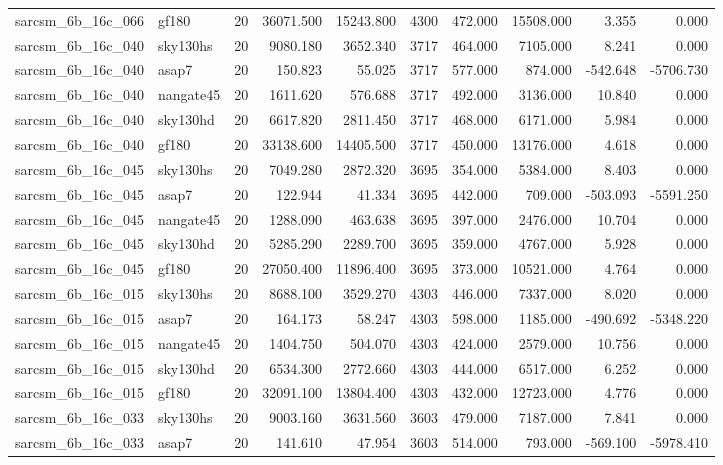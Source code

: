 \documentclass{article}
\begin{document}
\begin{longtable}{llrrrrrrrr}
sarcsm\_6b\_16c\_066 & gf180 & 20 & 36071.500 & 15243.800 & 4300 & 472.000 & 15508.000 & 3.355 & 0.000 \\
sarcsm\_6b\_16c\_040 & sky130hs & 20 & 9080.180 & 3652.340 & 3717 & 464.000 & 7105.000 & 8.241 & 0.000 \\
sarcsm\_6b\_16c\_040 & asap7 & 20 & 150.823 & 55.025 & 3717 & 577.000 & 874.000 & -542.648 & -5706.730 \\
sarcsm\_6b\_16c\_040 & nangate45 & 20 & 1611.620 & 576.688 & 3717 & 492.000 & 3136.000 & 10.840 & 0.000 \\
sarcsm\_6b\_16c\_040 & sky130hd & 20 & 6617.820 & 2811.450 & 3717 & 468.000 & 6171.000 & 5.984 & 0.000 \\
sarcsm\_6b\_16c\_040 & gf180 & 20 & 33138.600 & 14405.500 & 3717 & 450.000 & 13176.000 & 4.618 & 0.000 \\
sarcsm\_6b\_16c\_045 & sky130hs & 20 & 7049.280 & 2872.320 & 3695 & 354.000 & 5384.000 & 8.403 & 0.000 \\
sarcsm\_6b\_16c\_045 & asap7 & 20 & 122.944 & 41.334 & 3695 & 442.000 & 709.000 & -503.093 & -5591.250 \\
sarcsm\_6b\_16c\_045 & nangate45 & 20 & 1288.090 & 463.638 & 3695 & 397.000 & 2476.000 & 10.704 & 0.000 \\
sarcsm\_6b\_16c\_045 & sky130hd & 20 & 5285.290 & 2289.700 & 3695 & 359.000 & 4767.000 & 5.928 & 0.000 \\
sarcsm\_6b\_16c\_045 & gf180 & 20 & 27050.400 & 11896.400 & 3695 & 373.000 & 10521.000 & 4.764 & 0.000 \\
sarcsm\_6b\_16c\_015 & sky130hs & 20 & 8688.100 & 3529.270 & 4303 & 446.000 & 7337.000 & 8.020 & 0.000 \\
sarcsm\_6b\_16c\_015 & asap7 & 20 & 164.173 & 58.247 & 4303 & 598.000 & 1185.000 & -490.692 & -5348.220 \\
sarcsm\_6b\_16c\_015 & nangate45 & 20 & 1404.750 & 504.070 & 4303 & 424.000 & 2579.000 & 10.756 & 0.000 \\
sarcsm\_6b\_16c\_015 & sky130hd & 20 & 6534.300 & 2772.660 & 4303 & 444.000 & 6517.000 & 6.252 & 0.000 \\
sarcsm\_6b\_16c\_015 & gf180 & 20 & 32091.100 & 13804.400 & 4303 & 432.000 & 12723.000 & 4.776 & 0.000 \\
sarcsm\_6b\_16c\_033 & sky130hs & 20 & 9003.160 & 3631.560 & 3603 & 479.000 & 7187.000 & 7.841 & 0.000 \\
sarcsm\_6b\_16c\_033 & asap7 & 20 & 141.610 & 47.954 & 3603 & 514.000 & 793.000 & -569.100 & -5978.410 \\

\end{longtable}
\end{document}
